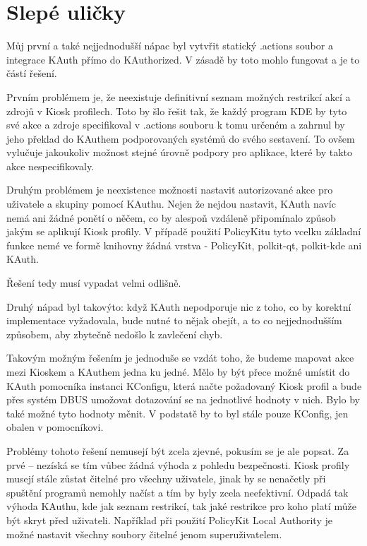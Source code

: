 \section{Slepé uličky}
Můj první a také nejjednodušší nápac byl vytvřit statický .actions soubor
a integrace KAuth přímo do KAuthorized. V zásadě by toto mohlo fungovat a je
to částí řešení.

Prvním problémem je, že neexistuje definitivní seznam možných restrikcí akcí
a zdrojů v Kiosk profilech. Toto by šlo řešit tak, že každý program KDE by tyto
své akce a zdroje specifikoval v .actions souboru k tomu určeném a zahrnul by
jeho překlad do KAuthem podporovaných systémů do svého sestavení. To ovšem
vylučuje jakoukoliv možnost stejné úrovně podpory pro aplikace, které by takto
akce nespecifikovaly.

Druhým problémem je neexistence možnosti nastavit autorizované akce pro
uživatele a skupiny pomocí KAuthu. Nejen že nejdou nastavit, KAuth navíc nemá
ani žádné ponětí o něčem, co by alespoň vzdáleně připomínalo způsob jakým
se aplikují Kiosk profily. V případě použití PolicyKitu tyto vcelku základní
funkce nemé ve formě knihovny žádná vrstva - PolicyKit, polkit-qt, polkit-kde
ani KAuth.

Řešení tedy musí vypadat velmi odlišně.

Druhý nápad byl takovýto: když KAuth nepodporuje nic z toho, co by korektní
implementace vyžadovala, bude nutné to nějak obejít, a to co nejjednodušším
způsobem, aby zbytečně nedošlo k zavlečení chyb.

Takovým možným řešením je jednoduše se vzdát toho, že budeme mapovat akce mezi
Kioskem a KAuthem jedna ku jedné. Mělo by být přece možné umístit do KAuth
pomocníka instanci KConfigu, která načte požadovaný Kiosk profil a bude přes
systém DBUS umožovat dotazování se na jednotlivé hodnoty v nich. Bylo by také
možné tyto hodnoty měnit. V podstatě by to byl stále pouze KConfig, jen obalen
v pomocníkovi.

Problémy tohoto řešení nemusejí být zcela zjevné, pokusím se je ale popsat.
Za prvé -- nezíská se tím vůbec žádná výhoda z pohledu bezpečnosti. Kiosk
profily musejí stále zůstat čitelné pro všechny uživatele, jinak by se
nenačetly při spuštění programů nemohly načíst a tím by byly zcela neefektivní.
Odpadá tak výhoda KAuthu, kde jak seznam restrikcí, tak jaké restrikce pro koho
platí může být skryt před uživateli. Například při použití PolicyKit Local
Authority je možné nastavit všechny soubory čitelné jenom superuživatelem.

